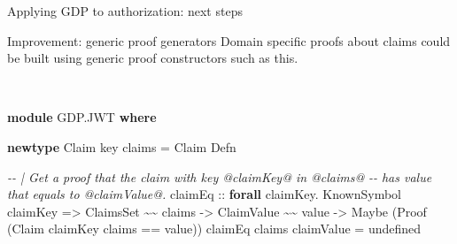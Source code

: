 \documentclass[
  9pt,
  ignorenonframetext,
]{beamer}
\newenvironment{Shaded}{}{}
\newcommand{\CommentTok}[1]{\textcolor[rgb]{0.38,0.63,0.69}{\textit{#1}}}
\newcommand{\DataTypeTok}[1]{\textcolor[rgb]{0.56,0.13,0.00}{#1}}
\newcommand{\FunctionTok}[1]{\textcolor[rgb]{0.02,0.16,0.49}{#1}}
\newcommand{\KeywordTok}[1]{\textcolor[rgb]{0.00,0.44,0.13}{\textbf{#1}}}
\newcommand{\NormalTok}[1]{#1}
\newcommand{\OperatorTok}[1]{\textcolor[rgb]{0.40,0.40,0.40}{#1}}
\newcommand{\OtherTok}[1]{\textcolor[rgb]{0.00,0.44,0.13}{#1}}
\begin{document}
\begin{frame}[fragile]{Applying GDP to authorization: next steps}
\protect\hypertarget{applying-gdp-to-authorization-next-steps}{}
\begin{block}{Improvement: generic proof generators}
\protect\hypertarget{improvement-generic-proof-generators}{}
Domain specific proofs about claims could be built using generic proof
constructors such as this.\\
\strut \\

\begin{Shaded}
\begin{Highlighting}[]
\KeywordTok{module} \DataTypeTok{GDP.JWT} \KeywordTok{where} 

\KeywordTok{newtype} \DataTypeTok{Claim}\NormalTok{ key claims }\OtherTok{=} \DataTypeTok{Claim} \DataTypeTok{Defn}

\CommentTok{{-}{-} | Get a proof that the claim with key @claimKey@ in @claims@ }
\CommentTok{{-}{-} has value that equals to @claimValue@.}
\NormalTok{claimEq}
\OtherTok{  ::} \KeywordTok{forall}\NormalTok{ claimKey}\OperatorTok{.} \DataTypeTok{KnownSymbol}\NormalTok{ claimKey }
  \OtherTok{=\textgreater{}} \DataTypeTok{ClaimsSet} \OperatorTok{\textasciitilde{}\textasciitilde{}}\NormalTok{ claims}
  \OtherTok{{-}\textgreater{}} \DataTypeTok{ClaimValue} \OperatorTok{\textasciitilde{}\textasciitilde{}}\NormalTok{ value}
  \OtherTok{{-}\textgreater{}} \DataTypeTok{Maybe}\NormalTok{ (}\DataTypeTok{Proof}\NormalTok{ (}\DataTypeTok{Claim}\NormalTok{ claimKey claims }\OperatorTok{==}\NormalTok{ value))}
\NormalTok{claimEq claims claimValue }\OtherTok{=} \FunctionTok{undefined}
\end{Highlighting}
\end{Shaded}
\end{block}




\end{frame}
\end{document}
